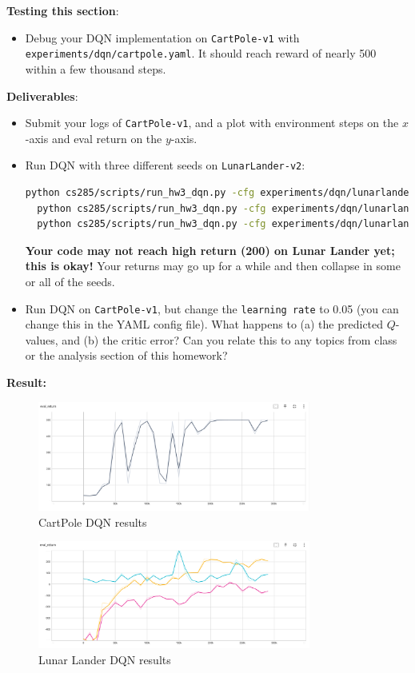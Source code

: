\textbf{Testing this section}:
\begin{itemize}
    \item Debug your DQN implementation on \verb|CartPole-v1| with \verb|experiments/dqn/cartpole.yaml|. It should reach reward of nearly 500 within a few thousand steps.
\end{itemize}

\textbf{Deliverables}:
\begin{itemize}
    \item Submit your logs of \verb|CartPole-v1|, and a plot with environment steps on the $x$-axis and eval return on the $y$-axis.
    \item Run DQN with three different seeds on \verb|LunarLander-v2|:
\begin{lstlisting}[language=bash,breaklines=true]
  python cs285/scripts/run_hw3_dqn.py -cfg experiments/dqn/lunarlander.yaml --seed 1
  python cs285/scripts/run_hw3_dqn.py -cfg experiments/dqn/lunarlander.yaml --seed 2
  python cs285/scripts/run_hw3_dqn.py -cfg experiments/dqn/lunarlander.yaml --seed 3
\end{lstlisting}
\textbf{Your code may not reach high return (200) on Lunar Lander yet; this is okay!} Your returns may go up for a while and then collapse in some or all of the seeds.
    \item Run DQN on \verb|CartPole-v1|, but change the \verb|learning rate| to 0.05 (you can change this in the YAML config file). What happens to (a) the predicted $Q$-values, and (b) the critic error? Can you relate this to any topics from class or the analysis section of this homework?
\end{itemize}

\textbf{Result:}
\begin{figure}[H]
    \centering
    \includegraphics[width=0.8\textwidth]{imgs/dqn/cartpole.png}
    \caption{CartPole DQN results}
    \label{fig:cartpole_dqn}
\end{figure}

\begin{figure}[H]
    \centering
    \includegraphics[width=0.8\textwidth]{imgs/dqn/lunarlander.png}
    \caption{Lunar Lander DQN results}
    \label{fig:lunarlander}
\end{figure}



